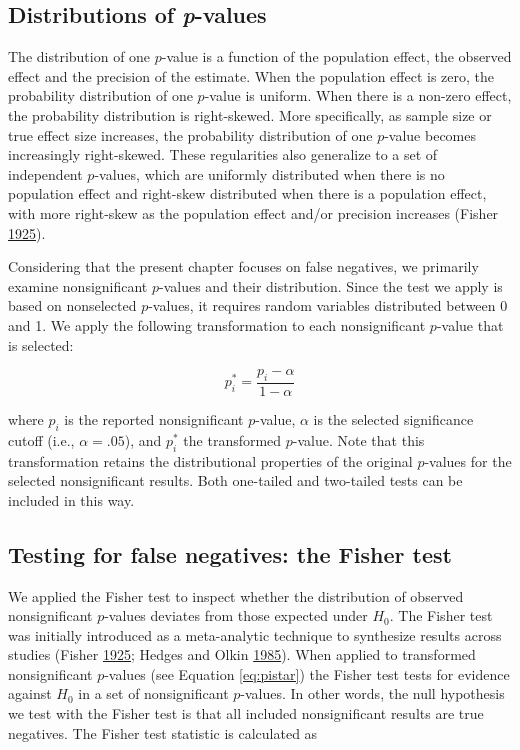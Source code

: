 \documentclass[a5paper]{book}
\begin{document}
\subsection{\texorpdfstring{Distributions of
\emph{p}-values}{Distributions of p-values}}\label{distributions-of-p-values}

The distribution of one \(p\)-value is a function of the population
effect, the observed effect and the precision of the estimate. When the
population effect is zero, the probability distribution of one
\(p\)-value is uniform. When there is a non-zero effect, the probability
distribution is right-skewed. More specifically, as sample size or true
effect size increases, the probability distribution of one \(p\)-value
becomes increasingly right-skewed. These regularities also generalize to
a set of independent \(p\)-values, which are uniformly distributed when
there is no population effect and right-skew distributed when there is a
population effect, with more right-skew as the population effect and/or
precision increases (Fisher
\protect\hyperlink{ref-Fisher1925-jl}{1925}).

Considering that the present chapter focuses on false negatives, we
primarily examine nonsignificant \(p\)-values and their distribution.
Since the test we apply is based on nonselected \(p\)-values, it
requires random variables distributed between 0 and 1. We apply the
following transformation to each nonsignificant \(p\)-value that is
selected:

\begin{equation}
p^*_i=\frac{p_i-\alpha}{1-\alpha}
\label{eq:pistar}
\end{equation}

where \(p_i\) is the reported nonsignificant \(p\)-value, \(\alpha\) is
the selected significance cutoff (i.e., \(\alpha=.05\)), and \(p^*_i\)
the transformed \(p\)-value. Note that this transformation retains the
distributional properties of the original \(p\)-values for the selected
nonsignificant results. Both one-tailed and two-tailed tests can be
included in this way.

\subsection{Testing for false negatives: the Fisher
test}\label{testing-for-false-negatives-the-fisher-test}

We applied the Fisher test to inspect whether the distribution of
observed nonsignificant \(p\)-values deviates from those expected under
\(H_0\). The Fisher test was initially introduced as a meta-analytic
technique to synthesize results across studies (Fisher
\protect\hyperlink{ref-Fisher1925-jl}{1925}; Hedges and Olkin
\protect\hyperlink{ref-Hedges1985-dy}{1985}). When applied to
transformed nonsignificant \(p\)-values (see Equation \eqref{eq:pistar})
the Fisher test tests for evidence against \(H_0\) in a set of
nonsignificant \(p\)-values. In other words, the null hypothesis we test
with the Fisher test is that all included nonsignificant results are
true negatives. The Fisher test statistic is calculated as
\end{document}
